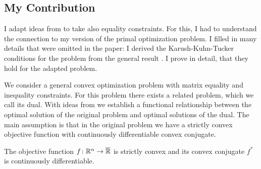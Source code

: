 \subsection*{My Contribution}
I adapt ideas from \cite{Tseng1991} to take also equality constraints. For this, I had to understand the connection to my version of the primal optimization problem. 
I filled in many details that were omitted in the paper:
I derived the Karush-Kuhn-Tucker conditions for the problem
from the general result \cite[Theorem~28.3]{Rockafellar1970}.
I prove in detail, that they hold for the adapted problem.


We consider a general convex optimization problem 
with matrix equality and inequality constraints.
For this problem there exists a related problem,
which we call its dual.
With ideas from \cite{Tseng1991} we establish 
a functional relationship
between the optimal solution of the original problem 
and
optimal solutions of the dual.
The main assumption is that in the original problem we have a strictly convex objective function 
with continuously differentiable 
convex conjugate. 
\begin{assumption}
  \label{cv:ts:asu}
  The objective function $f\colon \mathbb{R}^n\to \overline{\mathbb{R}}$ is strictly convex and its
convex conjugate $f^*$ is continuously differentiable.
\end{assumption}
